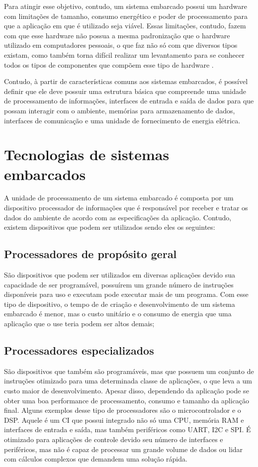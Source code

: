 Para atingir esse objetivo, contudo, um sistema embarcado possui um hardware com limitações de tamanho, consumo energético e poder de processamento para que a aplicação em que é utilizado seja viável. Essas limitações, contudo, fazem com que esse hardware  não possua a mesma padronização que o hardware utilizado em computadores pessoais, o que faz não só com que diversos tipos existam, como também torna difícil realizar um levantamento para se conhecer todos os tipos de componentes que compõem esse tipo de hardware \cite{marwedel2021embedded}. 

Contudo, à partir de características comuns aos sistemas embarcados, é possível definir que ele deve possuir uma estrutura básica que compreende uma unidade de processamento de informações, interfaces de entrada e saída de dados para que possam interagir com o ambiente, memórias para armazenamento de dados, interfaces de comunicação e uma unidade de fornecimento de energia elétrica. 


\section{Tecnologias de sistemas embarcados}


A unidade de processamento de um sistema embarcado é composta por um dispositivo processador de informações que é responsável por receber e tratar os dados do ambiente de acordo com as especificações da aplicação. Contudo, existem dispositivos que podem ser utilizados sendo eles os seguintes:


    \subsection{Processadores de propósito geral } São dispositivos que podem ser utilizados em diversas aplicações devido sua capacidade de ser programável, possuírem um grande número de instruções disponíveis para  uso e executam pode executar mais de um programa. Com esse tipo de dispositivo, o tempo de de criação e desenvolvimento de um sistema embarcado é menor, mas o custo unitário e o consumo de energia que uma aplicação que o use teria podem ser altos demais;
    
    \subsection{Processadores especializados } São dispositivos que também são programáveis, mas que possuem um conjunto de instruções otimizado para uma determinada classe de aplicações, o que leva a um custo maior de desenvolvimento. Apesar disso,  dependendo da aplicação pode se obter uma boa performance de processamento, consumo e tamanho da aplicação final. Alguns exemplos desse tipo de processadores são o microcontrolador e o \gls{DSP}. Aquele é um \gls{CI} que possui integrado não só uma \gls{CPU}, memória \gls{RAM} e interfaces de entrada e saída, mas também periféricos como \gls{UART}, \gls{I2C} e \gls{SPI}. É otimizado para aplicações de controle devido seu número de interfaces e periféricos, mas não é capaz de processar um grande volume de dados ou lidar com cálculos complexos que demandem uma solução rápida.
    
